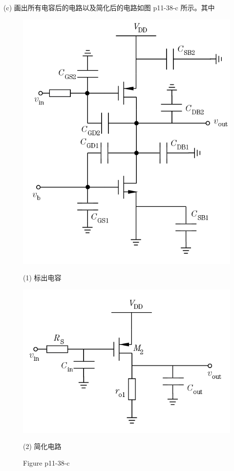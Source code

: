 \documentclass[hyperref, UTF8]{ctexart}
\begin{document}
    (c) 画出所有电容后的电路以及简化后的电路如图 p11-38-c 所示。其中
    \begin{figure}[!htb]
        \centering
        \begin{minipage}[t]{0.385\textwidth}
        \centering
        \includegraphics[width=1\textwidth]{p11-38-c-sol1.png}
        \caption*{(1) 标出电容}
        \end{minipage}
        \begin{minipage}[t]{0.383\textwidth}
        \centering
        \includegraphics[width=1\textwidth]{p11-38-c-sol2.png}
        \caption*{(2) 简化电路}
        \end{minipage}
        \caption*{Figure p11-38-c}
    \end{figure}
\end{document}
